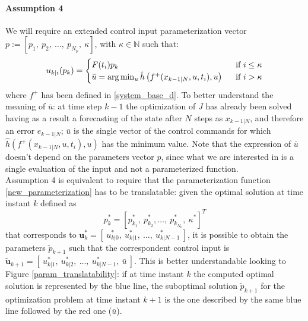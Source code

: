 \paragraph{Assumption 4}
We will require an extended control input parameterization vector $p:=[p_1,\ p_2,\ \dots,\ p_{N_p},\ \kappa]$, with $\kappa\in\mathbb{N}$ such that: 
\begin{equation}
\begin{split}\label{new_parameterization}
    u_{k|i}(p_k)=
        \begin{cases}
            F(t_i){p_k}\ \ \ \ \   &\textnormal{if } i\le\kappa \\
            \bar{u}=\arg \min_u \hat{h}\left(f^+(x_{k-1|N},u,t_i),u\right)\ \ &\textnormal{if } i> \kappa
        \end{cases}
    \end{split}
\end{equation} 
where $f^+$ has been defined in \ref{system_base_d}. To better understand the meaning of $\bar{u}$: at time step $k-1$ the optimization of $J$ has already been solved having as a result a forecasting of the state after $N$ steps as $x_{k-1|N}$, and therefore an error $e_{k-1|N}$; $\bar{u}$ is the single vector of the control commands for which $\hat{h}\left(f^+(x_{k-1|N},u,t_i),u\right)$ has the minimum value. Note that the expression of $\bar{u}$ doesn't depend on the parameters vector $p$, since what we are interested in is a single evaluation of the input and not a parameterized function.\\
Assumption 4 is equivalent to require that the parameterization function \ref{new_parameterization} has to be translatable: given the optimal solution at time instant $k$ defined as $$p_k^*=\left[ p_{k_1}^*,\ p_{k_2}^*,  \dots,\ p_{k_{N_p}}^*,\ \kappa^* \right]^T$$ that corresponds to $  \textbf{u}_k^*=[\ u_{k|0}^*,\ u_{k|1}^*,\  \dots,\  u_{k|{N-1}}^*\ ]$, it is possible to obtain the parameters $\tilde{p}_{k+1}$ such that the correspondent control input is $  \tilde{\textbf{u}}_{k+1}=[\ u_{k|1}^*,\ u_{k|2}^*,\  \dots,\  u_{k|{N-1}}^*,\ \bar{u} \ ]$. This is better understandable looking to Figure \ref{param_translatability}: if at time instant $k$ the computed optimal solution is represented by the blue line, the suboptimal solution $\tilde{p}_{k+1}$ for the optimization problem at time instant $k+1$ is the one described by the same blue line followed by the red one ($\bar{u}$).
